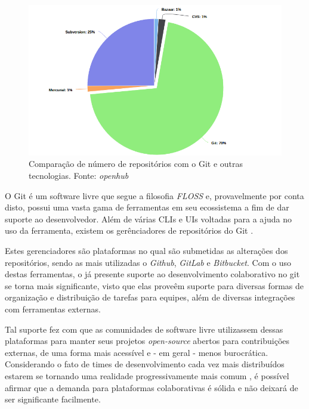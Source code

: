 \begin{figure}[h]
    \centering
    \includegraphics[width=16cm]{figuras/git_svn_comp.png}
    \caption{Comparação de número de repositórios com o Git e outras tecnologias. Fonte: \textit{openhub}}
    \label{Fig_comparisson_git}
\end{figure}

O Git é um software livre que segue a filosofia \textit{FLOSS} e, provavelmente por conta disto, possui uma vasta gama de ferramentas em seu ecossistema a fim de dar suporte ao desenvolvedor.
Além de várias CLIs e UIs voltadas para a ajuda no uso da ferramenta, existem os gerênciadores de repositórios do Git \cite{building_tools_github}. 

Estes gerenciadores são plataformas no qual são submetidas as alterações dos repositórios, sendo as mais utilizadas o \textit{Github}, \textit{GitLab} e \textit{Bitbucket}. Com o uso destas ferramentas, o já presente suporte ao desenvolvimento colaborativo no git se torna mais significante, visto que elas proveêm suporte para diversas formas de organização e distribuição de tarefas para equipes, além de diversas integrações com ferramentas externas. 




Tal suporte fez com que as comunidades de software livre utilizassem dessas plataformas para manter seus projetos \textit{open-source} abertos para contribuições externas, de uma forma mais acessível e - em geral - menos burocrática. Considerando o fato de times de desenvolvimento cada vez mais distribuídos estarem se tornando uma realidade progressivamente mais comum \cite{developer_survey}, é possível afirmar que a demanda para plataformas colaborativas é sólida e não deixará de ser significante facilmente.

